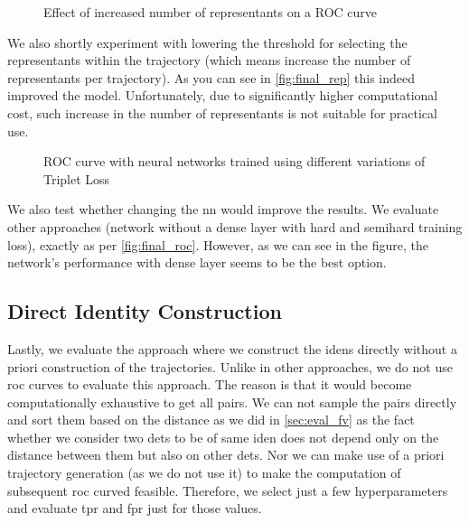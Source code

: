 \begin{figure}
    \centering
    \def\svgwidth{\columnwidth}
    {}
    \caption{Effect of increased number of representants on a ROC curve}
    \label{fig:final_rep}
\end{figure}

We also shortly experiment with lowering the threshold for selecting the representants within the trajectory (which means increase the number of representants per trajectory). As you can see in \autoref{fig:final_rep} this indeed improved the model. Unfortunately, due to significantly higher computational cost, such increase in the number of representants is not suitable for practical use.

\begin{figure}
    \centering
    \def\svgwidth{\columnwidth}
    {}
    \caption{ROC curve with neural networks trained using different variations of Triplet Loss}
    \label{fig:final_nn}
\end{figure}

We also test whether changing the \gls{nn} would improve the results. We evaluate other approaches (network without a dense layer with hard and semihard training loss), exactly as per \autoref{fig:final_roc}. However, as we can see in the figure, the network's performance with dense layer seems to be the best option.

\subsection{Direct Identity Construction}

Lastly, we evaluate the approach where we construct the \glspl{iden} directly without a priori construction of the trajectories. Unlike in other approaches, we do not use \gls{roc} curves to evaluate this approach. The reason is that it would become computationally exhaustive to get all pairs. We can not sample the pairs directly and sort them based on the distance as we did in \autoref{sec:eval_fv} as the fact whether we consider two \glspl{det} to be of same \gls{iden} does not depend only on the distance between them but also on other \glspl{det}. Nor we can make use of a priori trajectory generation (as we do not use it) to make the computation of subsequent \gls{roc} curved feasible. Therefore, we select just a few hyperparameters and evaluate \gls{tpr} and \gls{fpr} just for those values.

